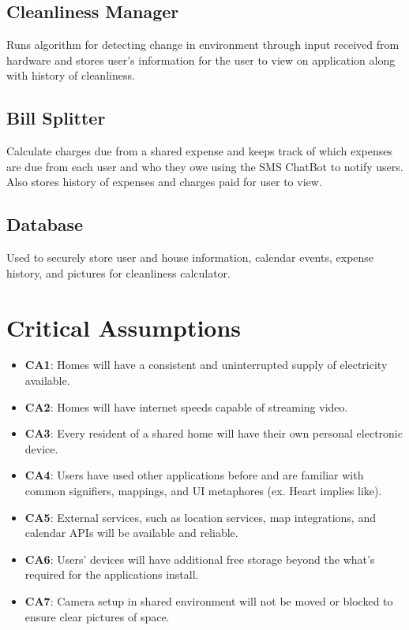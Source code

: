 \documentclass{article}
\begin{document}
\subsection{Cleanliness Manager}
Runs algorithm for detecting change in environment through input received from hardware and stores user's information for the user to view on application along with history of cleanliness.

\subsection{Bill Splitter}
Calculate charges due from a shared expense and keeps track of which expenses are due from each user and who they owe using the SMS ChatBot to notify users. Also stores history of expenses and charges paid for user to view.

\subsection{Database}
Used to securely store user and house information, calendar events, expense history, and pictures for cleanliness calculator.


\section{Critical Assumptions}

\begin{itemize}
\item \textbf{CA1}: Homes will have a consistent and uninterrupted supply of electricity available.
\item \textbf{CA2}: Homes will have internet speeds capable of streaming video.
\item \textbf{CA3}: Every resident of a shared home will have their own personal electronic device.
\item \textbf{CA4}: Users have used other applications before and are familiar with common signifiers, mappings, and UI metaphores (ex. Heart implies like).
\item \textbf{CA5}: External services, such as location services, map integrations, and calendar APIs will be available and reliable.
\item \textbf{CA6}: Users' devices will have additional free storage beyond the what's required for the applications install.
\item \textbf{CA7}: Camera setup in shared environment will not be moved or blocked to ensure clear pictures of space.
\end{itemize}
\end{document}
